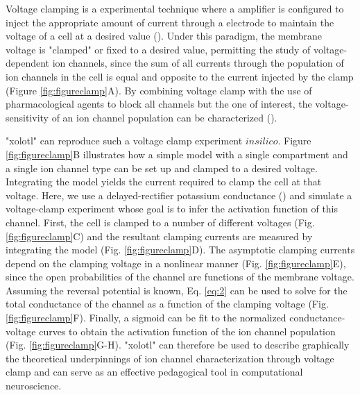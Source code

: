 \documentclass{frontiersSCNS} %
\begin{document}
Voltage clamping is a experimental technique where a amplifier is configured to inject the appropriate amount of current through a electrode to maintain the voltage of a cell at a desired value (\cite{dayanTheoreticalNeuroscience2001}). Under this paradigm, the membrane voltage is "clamped" or fixed to a desired value, permitting the study of voltage-dependent ion channels, since the sum of all currents through the population of ion channels in the cell is equal and opposite to the current injected by the clamp (Figure \ref{fig:figureclamp}A). By combining voltage clamp with the use of pharmacological agents to block all channels but the one of interest, the voltage-sensitivity of an ion channel population can be characterized (\cite{coleIonicCurrentMeasurements1960, coleIonsPotentialsNerve1955, hodgkinEffectSodiumIons1949, hodgkinMeasurementCurrentvoltageRelations1952a, hodgkinQuantitativeDescriptionMembrane1952a, turrigianoSelectiveRegulationCurrent1995}). 

"xolotl" can reproduce such a voltage clamp experiment $in silico$. Figure \ref{fig:figureclamp}B illustrates how a simple model with a single compartment and a single ion channel type can be set up and clamped to a desired voltage.  Integrating the model yields the current required to clamp the cell at that voltage. Here, we use a delayed-rectifier potassium conductance (\cite{liuModelNeuronActivityDependent1998}) and simulate a voltage-clamp experiment whose goal is to infer the activation function of this channel. First, the cell is clamped to a number of different voltages (Fig. \ref{fig:figureclamp}C) and the resultant clamping currents are measured by integrating the model (Fig. \ref{fig:figureclamp}D). The asymptotic clamping currents depend on the clamping voltage in a nonlinear manner (Fig. \ref{fig:figureclamp}E), since the open probabilities of the channel are functions of the membrane voltage. Assuming the reversal potential is known, Eq. \eqref{eq:2} can be used to solve for the total conductance of the channel as a function of the clamping voltage (Fig. \ref{fig:figureclamp}F). Finally, a sigmoid can be fit to the normalized conductance-voltage curves to obtain the activation function of the ion channel population (Fig. \ref{fig:figureclamp}G-H). "xolotl" can therefore be used to describe graphically the theoretical underpinnings of ion channel characterization through voltage clamp and can serve as an effective pedagogical tool in computational neuroscience.

%
%
%
%
%
%
\end{document}
